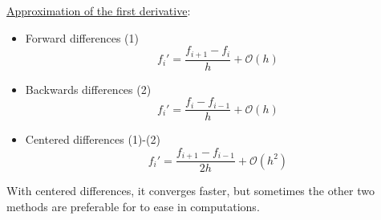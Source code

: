 \underline{Approximation of the first derivative}: \\
\begin{itemize}
    \item Forward differences (1) $$f_i' = \frac{f_{i+1} - f_i}{h} + \mathcal{O}(h)$$
    \item Backwards differences (2) $$f_i' = \frac{f_i-f_{i-1}}{h} + \mathcal{O}(h)$$
    \item Centered differences (1)-(2) $$f_i' = \frac{f_{i+1} - f_{i-1}}{2h} + \mathcal{O}(h^2)$$
\end{itemize}

\begin{remark}
  With centered differences, it converges faster, but sometimes the other two methods are preferable for to ease in computations.
\end{remark}